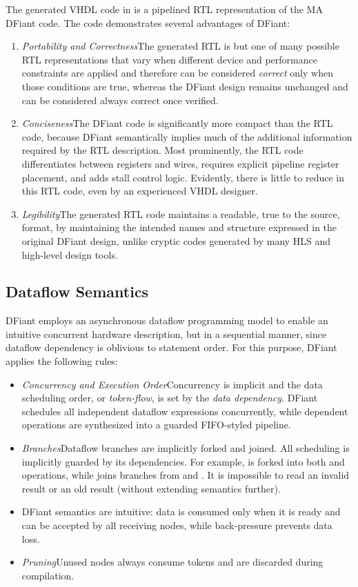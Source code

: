 The generated VHDL code in  is a pipelined RTL representation of the MA DFiant code. The code demonstrates several advantages of DFiant:
\begin{enumerate}[leftmargin=*]
	\item \textit{Portability and Correctness}\quad The generated RTL is but one of many possible RTL representations that vary when different device and performance constraints are applied and therefore can be considered \textit{correct} only when those conditions are true, whereas the DFiant design remains unchanged and can be considered always correct once verified.  
	\item \textit{Conciseness}\quad  The DFiant code is significantly more compact than the RTL code, because DFiant semantically implies much of the additional information required by the RTL description. Most prominently, the RTL code differentiates between registers and wires, requires explicit pipeline register placement, and adds stall control logic. Evidently, there is little to reduce in this RTL code, even by an experienced VHDL designer.
	\item \textit{Legibility}\quad The generated RTL code maintains a readable, true to the source, format, by maintaining the intended names and structure expressed in the original DFiant design, unlike cryptic codes generated by many HLS and high-level design tools.  
\end{enumerate} 

\subsection{Dataflow Semantics}
DFiant employs an asynchronous dataflow programming model to enable an intuitive concurrent hardware description, but in a sequential manner, since dataflow dependency is oblivious to statement order. For this purpose, DFiant applies the following rules:  

\begin{itemize}[leftmargin=*]
	\item \textit{Concurrency and Execution Order}\quad Concurrency is implicit and the data scheduling order, or \textit{token-flow}, is set by the \textit{data dependency}. DFiant schedules all independent dataflow expressions concurrently, while dependent operations are synthesized into a guarded FIFO-styled pipeline.
	\item \textit{Branches}\quad Dataflow branches are implicitly forked and joined. All scheduling is implicitly guarded by its dependencies. For example,  is forked into both  and  operations, while  joins branches from  and .
	It is impossible to read an invalid result or an old result (without extending semantics further).
	\item DFiant semantics are intuitive: data is consumed only when it is ready and can be accepted by all receiving nodes, while back-pressure prevents data loss. 
	\item \textit{Pruning}\quad Unused nodes always consume tokens and are discarded during compilation. 
\end{itemize} 

